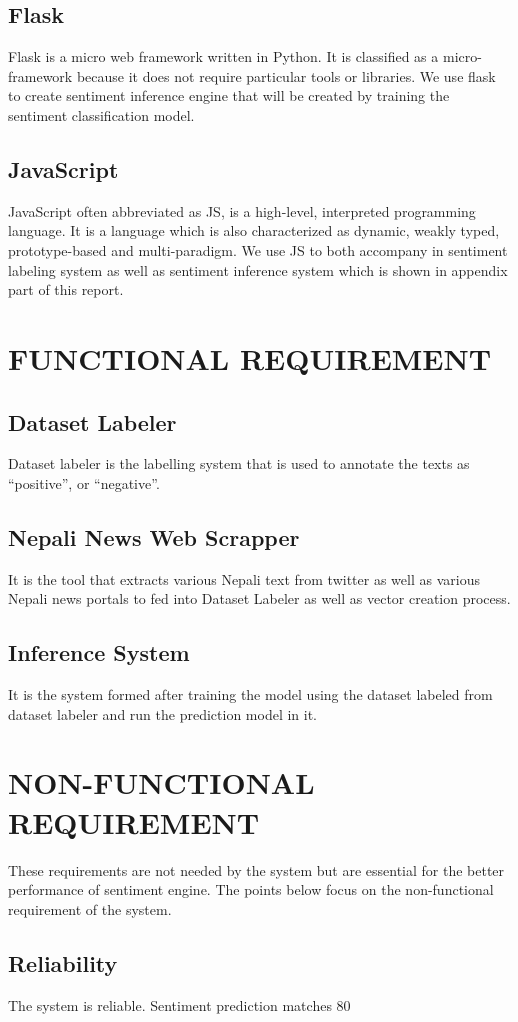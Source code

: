             \subsection{Flask}
Flask is a micro web framework written in Python. It is classified as a micro-
framework because it does not require particular tools or libraries. We use flask to
create sentiment inference engine that will be created by training the sentiment
classification model.
            \subsection{JavaScript}
JavaScript often abbreviated as JS, is a high-level, interpreted programming language.
It is a language which is also characterized as dynamic, weakly typed, prototype-based
and multi-paradigm. We use JS to both accompany in sentiment labeling system as well
as sentiment inference system which is shown in appendix part of this report.
        \section{FUNCTIONAL REQUIREMENT}
            \subsection{Dataset Labeler}
Dataset labeler is the labelling system that is used to annotate the texts as “positive”, or
“negative”.
            \subsection{Nepali News Web Scrapper}
It is the tool that extracts various Nepali text from twitter as well as various Nepali news
portals to fed into Dataset Labeler as well as vector creation process.
            \subsection{Inference System}
It is the system formed after training the model using the dataset labeled from dataset
labeler and run the prediction model in it.
        \section{NON-FUNCTIONAL REQUIREMENT}
These requirements are not needed by the system but are essential for the better
performance of sentiment engine. The points below focus on the non-functional
requirement of the system.
            \subsection{Reliability}
The system is reliable. Sentiment prediction matches 80%
